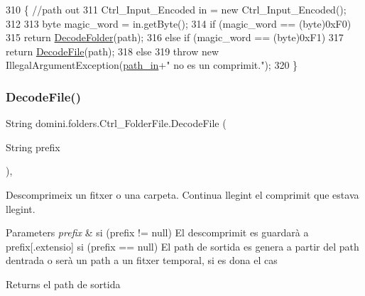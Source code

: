 \begin{DoxyCode}
310                                        \{ \textcolor{comment}{//path out}
311         Ctrl\_Input\_Encoded in = \textcolor{keyword}{new} Ctrl\_Input\_Encoded();
312 
313         byte magic\_word = in.getByte();
314         \textcolor{keywordflow}{if} (magic\_word == (byte)0xF0)
315             \textcolor{keywordflow}{return} \hyperlink{classdomini_1_1folders_1_1Ctrl__FolderFile_ae8f46feaced983c27c6537794f823dd8}{DecodeFolder}(path);
316         \textcolor{keywordflow}{else} \textcolor{keywordflow}{if} (magic\_word == (byte)0xF1) 
317             \textcolor{keywordflow}{return} \hyperlink{classdomini_1_1folders_1_1Ctrl__FolderFile_aa12178fff5fbb832759b7328cbdb4415}{DecodeFile}(path);
318         \textcolor{keywordflow}{else}
319             \textcolor{keywordflow}{throw} \textcolor{keyword}{new} IllegalArgumentException(\hyperlink{classdomini_1_1folders_1_1Ctrl__FolderFile_a0d3946bb2832a1f34d0c2227df5c71c4}{path\_in}+\textcolor{stringliteral}{" no es un comprimit."});
320     \}
\end{DoxyCode}
\mbox{\label{classdomini_1_1folders_1_1Ctrl__FolderFile_aa12178fff5fbb832759b7328cbdb4415}} 
\subsubsection{\texorpdfstring{Decode\+File()}{DecodeFile()}}
{\footnotesize\ttfamily String domini.\+folders.\+Ctrl\+\_\+\+Folder\+File.\+Decode\+File (\begin{DoxyParamCaption}\item[{String}]{prefix }\end{DoxyParamCaption})\hspace{0.3cm}{\ttfamily [inline]}, {\ttfamily [private]}}



Descomprimeix un fitxer o una carpeta. Continua llegint el comprimit que estava llegint. 


\begin{DoxyParams}{Parameters}
{\em prefix} & si (prefix != null) El descomprimit es guardarà a prefix\mbox{[}.extensio\mbox{]} si (prefix == null) El path de sortida es genera a partir del path d\textquotesingle{}entrada o serà un path a un fitxer temporal, si es dona el cas \\
\hline
\end{DoxyParams}
\begin{DoxyReturn}{Returns}
el path de sortida 
\end{DoxyReturn}


